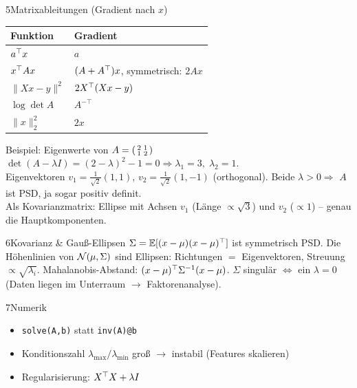 \begin{hngrid}
%
\begin{hnp}[raster multicolumn=3,acc=hngreen]{5}{Matrixableitungen (Gradient nach $x$)}
\renewcommand{\arraystretch}{1.3}
\begin{tabular}{@{}p{3.6cm}p{4.6cm}@{}}
\hline
\textbf{Funktion}&\textbf{Gradient}\\\hline
$a^{\top} x$&$a$\\
$x^{\top} Ax$&$(A+A^{\top})x$, symmetrisch: $2Ax$\\
$\|Xx-y\|^2$&$2X^{\top}(Xx-y)$\\
$\log\det A$&$A^{-\top}$\\
$\|x\|_2^2$&$2x$\\\hline
\end{tabular}
\end{hnp}
%
\begin{hnex}[raster multicolumn=3]{Beispiel: Eigenwerte von $A=\begin{psmallmatrix}2&1\\1&2\end{psmallmatrix}$}
\hnsol\ $\det(A-\lambda I)=(2-\lambda)^2-1=0\Rightarrow\lambda_1=3,\;\lambda_2=1$.\\
Eigenvektoren $v_1=\tfrac1{\sqrt2}(1,1)$, $v_2=\tfrac1{\sqrt2}(1,-1)$ (orthogonal). Beide $\lambda>0\Rightarrow$ $A$ ist PSD, ja sogar positiv definit.\\
Als Kovarianzmatrix: Ellipse mit Achsen $v_1$ (Länge $\propto\sqrt3$) und $v_2$ ($\propto1$) -- genau die Hauptkomponenten.
\end{hnex}
%
\begin{hnp}[raster multicolumn=3,acc=hnrose]{6}{Kovarianz \& Gauß-Ellipsen}
$\Sigma=\mathbb{E}[(x-\mu)(x-\mu)^{\top}]$ ist symmetrisch PSD. Die Höhenlinien von $\mathcal{N}(\mu,\Sigma)$ sind Ellipsen: Richtungen $=$ Eigenvektoren, Streuung $\propto\sqrt{\lambda_i}$. Mahalanobis-Abstand: $(x-\mu)^{\top}\Sigma^{-1}(x-\mu)$. $\Sigma$ singulär $\Leftrightarrow$ ein $\lambda=0$ (Daten liegen im Unterraum $\to$ Faktorenanalyse).
\end{hnp}
%
\begin{hnp}[raster multicolumn=2,acc=hngreen]{7}{Numerik}
\begin{itemize}
\item \texttt{solve(A,b)} statt \texttt{inv(A)@b}
\item Konditionszahl $\lambda_{\max}/\lambda_{\min}$ groß $\to$ instabil (Features skalieren)
\item Regularisierung: $X^{\top} X+\lambda I$
\end{itemize}
\end{hnp}

\end{hngrid}
